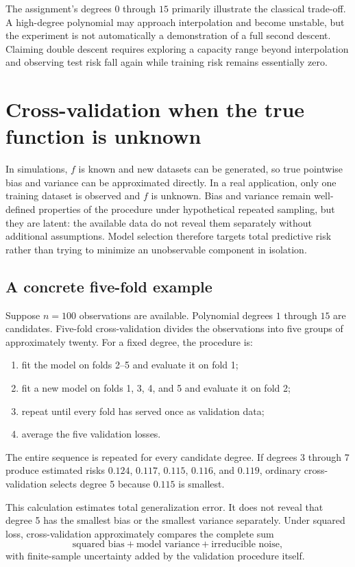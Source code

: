 \documentclass[11pt,a4paper]{article}
\begin{document}
The assignment's degrees $0$ through $15$ primarily illustrate the classical trade-off. A high-degree polynomial may approach interpolation and become unstable, but the experiment is not automatically a demonstration of a full second descent. Claiming double descent requires exploring a capacity range beyond interpolation and observing test risk fall again while training risk remains essentially zero.

\section{Cross-validation when the true function is unknown}
\label{sec:cv}

In simulations, $f$ is known and new datasets can be generated, so true pointwise bias and variance can be approximated directly. In a real application, only one training dataset is observed and $f$ is unknown. Bias and variance remain well-defined properties of the procedure under hypothetical repeated sampling, but they are latent: the available data do not reveal them separately without additional assumptions. Model selection therefore targets total predictive risk rather than trying to minimize an unobservable component in isolation.

\subsection{A concrete five-fold example}

Suppose $n=100$ observations are available. Polynomial degrees $1$ through $15$ are candidates. Five-fold cross-validation divides the observations into five groups of approximately twenty. For a fixed degree, the procedure is:
\begin{enumerate}
  \item fit the model on folds 2--5 and evaluate it on fold 1;
  \item fit a new model on folds 1, 3, 4, and 5 and evaluate it on fold 2;
  \item repeat until every fold has served once as validation data;
  \item average the five validation losses.
\end{enumerate}
The entire sequence is repeated for every candidate degree. If degrees 3 through 7 produce estimated risks $0.124$, $0.117$, $0.115$, $0.116$, and $0.119$, ordinary cross-validation selects degree 5 because $0.115$ is smallest.

This calculation estimates total generalization error. It does not reveal that degree 5 has the smallest bias or the smallest variance separately. Under squared loss, cross-validation approximately compares the complete sum
\begin{equation*}
  \text{squared bias}+\text{model variance}+\text{irreducible noise},
\end{equation*}
with finite-sample uncertainty added by the validation procedure itself.
\end{document}
